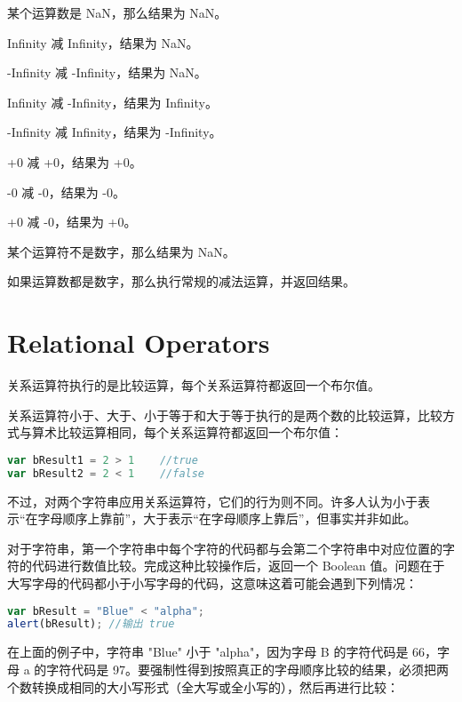 \begin{compactitem}
\item 某个运算数是 NaN，那么结果为 NaN。
\item Infinity 减 Infinity，结果为 NaN。
\item -Infinity 减 -Infinity，结果为 NaN。
\item Infinity 减 -Infinity，结果为 Infinity。
\item -Infinity 减 Infinity，结果为 -Infinity。
\item +0 减 +0，结果为 +0。
\item -0 减 -0，结果为 -0。
\item +0 减 -0，结果为 +0。
\item 某个运算符不是数字，那么结果为 NaN。
\end{compactitem}

如果运算数都是数字，那么执行常规的减法运算，并返回结果。





\chapter{Relational Operators}


关系运算符执行的是比较运算，每个关系运算符都返回一个布尔值。


关系运算符小于、大于、小于等于和大于等于执行的是两个数的比较运算，比较方式与算术比较运算相同，每个关系运算符都返回一个布尔值：

\begin{lstlisting}[language=JavaScript]
var bResult1 = 2 > 1	//true
var bResult2 = 2 < 1	//false
\end{lstlisting}

不过，对两个字符串应用关系运算符，它们的行为则不同。许多人认为小于表示“在字母顺序上靠前”，大于表示“在字母顺序上靠后”，但事实并非如此。

对于字符串，第一个字符串中每个字符的代码都与会第二个字符串中对应位置的字符的代码进行数值比较。完成这种比较操作后，返回一个 Boolean 值。问题在于大写字母的代码都小于小写字母的代码，这意味这着可能会遇到下列情况：


\begin{lstlisting}[language=JavaScript]
var bResult = "Blue" < "alpha";
alert(bResult);	//输出 true
\end{lstlisting}


在上面的例子中，字符串 "Blue" 小于 "alpha"，因为字母 B 的字符代码是 66，字母 a 的字符代码是 97。要强制性得到按照真正的字母顺序比较的结果，必须把两个数转换成相同的大小写形式（全大写或全小写的），然后再进行比较：

